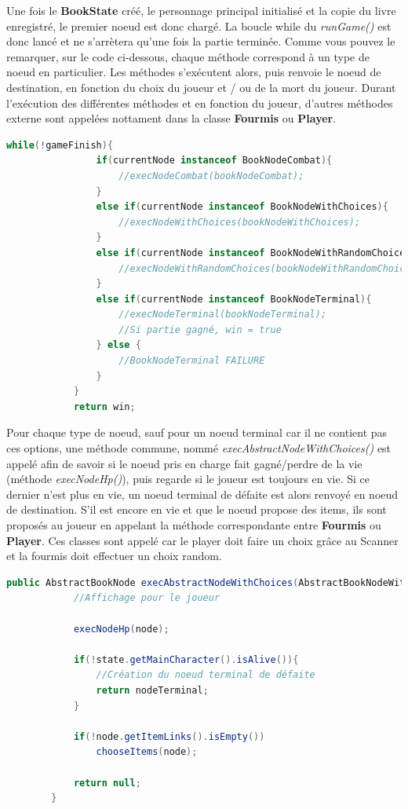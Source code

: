 		Une fois le \textbf{BookState} créé, le personnage principal initialisé et la copie du livre enregistré, le premier noeud est donc chargé. La boucle while du \textit{runGame()} est donc lancé et ne s'arrètera qu'une fois la partie terminée. Comme vous pouvez le remarquer, sur le code ci-dessous, chaque méthode correspond à un type de noeud en particulier. Les méthodes s'exécutent alors, puis renvoie le noeud de destination, en fonction du choix du joueur et / ou de la mort du joueur. Durant l'exécution des différentes méthodes et en fonction du joueur, d'autres méthodes externe sont appelées nottament dans la classe \textbf{Fourmis} ou \textbf{Player}.

		\begin{lstlisting}[language=java, label=lst:runGame, caption=Méthode runGame()]
			while(!gameFinish){
				if(currentNode instanceof BookNodeCombat){
					//execNodeCombat(bookNodeCombat);
				}
				else if(currentNode instanceof BookNodeWithChoices){
					//execNodeWithChoices(bookNodeWithChoices);
				}
				else if(currentNode instanceof BookNodeWithRandomChoices){
					//execNodeWithRandomChoices(bookNodeWithRandomChoices);
				}
				else if(currentNode instanceof BookNodeTerminal){
					//execNodeTerminal(bookNodeTerminal);
					//Si partie gagné, win = true
				} else {
					//BookNodeTerminal FAILURE
				}
			}
			return win;
		\end{lstlisting}

		Pour chaque type de noeud, sauf pour un noeud terminal car il ne contient pas ces options, une méthode commune, nommé \textit{execAbstractNodeWithChoices()} est appelé afin de savoir si le noeud pris en charge fait gagné/perdre de la vie (méthode \textit{execNodeHp()}), puis regarde si le joueur est toujours en vie. Si ce dernier n'est plus en vie, un noeud terminal de défaite est alors renvoyé en noeud de destination. S'il est encore en vie et que le noeud propose des items, ils sont proposés au joueur en appelant la méthode correspondante entre \textbf{Fourmis} ou \textbf{Player}. Ces classes sont appelé car le player doit faire un choix grâce au Scanner et la fourmis doit effectuer un choix random.\\

		\begin{lstlisting}[language=java, caption=Méthode execAbstractNodeWithChoices(), label=lst:execAbstractNodeWithChoices]
		public AbstractBookNode execAbstractNodeWithChoices(AbstractBookNodeWithChoices node){
			//Affichage pour le joueur

			execNodeHp(node);

			if(!state.getMainCharacter().isAlive()){
				//Création du noeud terminal de défaite
				return nodeTerminal;
			}

			if(!node.getItemLinks().isEmpty())
				chooseItems(node);

			return null;
		}
		\end{lstlisting}

